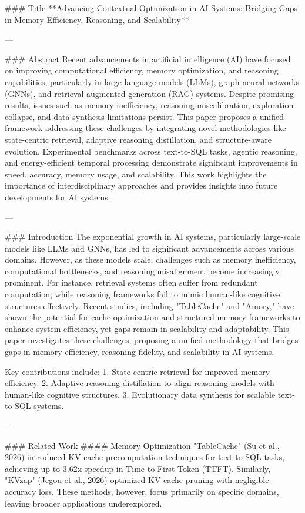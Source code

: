 ### Title  
**Advancing Contextual Optimization in AI Systems: Bridging Gaps in Memory Efficiency, Reasoning, and Scalability**

---

### Abstract  
Recent advancements in artificial intelligence (AI) have focused on improving computational efficiency, memory optimization, and reasoning capabilities, particularly in large language models (LLMs), graph neural networks (GNNs), and retrieval-augmented generation (RAG) systems. Despite promising results, issues such as memory inefficiency, reasoning miscalibration, exploration collapse, and data synthesis limitations persist. This paper proposes a unified framework addressing these challenges by integrating novel methodologies like state-centric retrieval, adaptive reasoning distillation, and structure-aware evolution. Experimental benchmarks across text-to-SQL tasks, agentic reasoning, and energy-efficient temporal processing demonstrate significant improvements in speed, accuracy, memory usage, and scalability. This work highlights the importance of interdisciplinary approaches and provides insights into future developments for AI systems.

---

### Introduction  
The exponential growth in AI systems, particularly large-scale models like LLMs and GNNs, has led to significant advancements across various domains. However, as these models scale, challenges such as memory inefficiency, computational bottlenecks, and reasoning misalignment become increasingly prominent. For instance, retrieval systems often suffer from redundant computation, while reasoning frameworks fail to mimic human-like cognitive structures effectively. Recent studies, including "TableCache" and "Amory," have shown the potential for cache optimization and structured memory frameworks to enhance system efficiency, yet gaps remain in scalability and adaptability. This paper investigates these challenges, proposing a unified methodology that bridges gaps in memory efficiency, reasoning fidelity, and scalability in AI systems.

Key contributions include:
1. State-centric retrieval for improved memory efficiency.
2. Adaptive reasoning distillation to align reasoning models with human-like cognitive structures.
3. Evolutionary data synthesis for scalable text-to-SQL systems.

---

### Related Work  
#### Memory Optimization  
"TableCache" (Su et al., 2026) introduced KV cache precomputation techniques for text-to-SQL tasks, achieving up to 3.62x speedup in Time to First Token (TTFT). Similarly, "KVzap" (Jegou et al., 2026) optimized KV cache pruning with negligible accuracy loss. These methods, however, focus primarily on specific domains, leaving broader applications underexplored.

